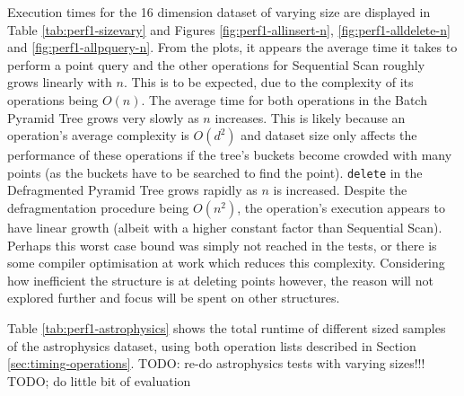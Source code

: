 Execution times for the 16 dimension dataset of varying size are displayed in Table \ref{tab:perf1-sizevary} and Figures \ref{fig:perf1-allinsert-n}, \ref{fig:perf1-alldelete-n} and \ref{fig:perf1-allpquery-n}. From the plots, it appears the average time it takes to perform a point query and the other operations for Sequential Scan roughly grows linearly with $n$. This is to be expected, due to the complexity of its operations being $O(n)$. The average time for both operations in the Batch Pyramid Tree grows very slowly as $n$ increases. This is likely because an operation's average complexity is $O(d^2)$ and dataset size only affects the performance of these operations if the tree's buckets become crowded with many points (as the buckets have to be searched to find the point). \texttt{delete} in the Defragmented Pyramid Tree grows rapidly as $n$ is increased. Despite the defragmentation procedure being $O(n^2)$, the operation's execution appears to have linear growth (albeit with a higher constant factor than Sequential Scan). Perhaps this worst case bound was simply not reached in the tests, or there is some compiler optimisation at work which reduces this complexity. Considering how inefficient the structure is at deleting points however, the reason will not explored further and focus will be spent on other structures.

Table \ref{tab:perf1-astrophysics} shows the total runtime of different sized samples of the astrophysics dataset, using both operation lists described in Section \ref{sec:timing-operations}.
TODO: re-do astrophysics tests with varying sizes!!!
TODO; do little bit of evaluation

